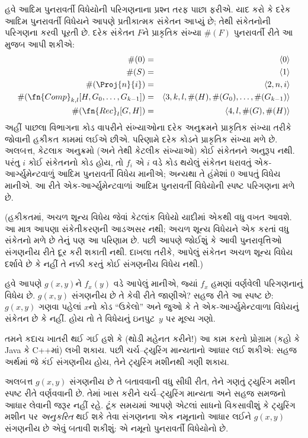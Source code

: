 હવે આદિમ પુનરાવર્તી વિધેયોની પરિગણનાના પ્રશ્ન તરફ પાછા ફરીએ.
યાદ કરો કે દરેક આદિમ પુનરાવર્તી વિધેયને આપણે પ્રતીકાત્મક
સંકેતન આપ્યું છે; તેથી સંકેતનોની પરિગણના કરવી પૂરતી છે. દરેક
સંકેતન $F$ને પ્રાકૃતિક સંખ્યા $\#(F)$ પુનરાવર્તી રીતે આ મુજબ
આપી શકીએ:
\begin{eqnarray*}
\#(0) & = & \langle 0 \rangle \\
\#(S) & = & \langle 1 \rangle \\
\#(\Proj{n}{i}) & = & \langle 2, n, i \rangle \\
\#(\fn{Comp}_{k,l}[H,G_0,\dots,G_{k-1}]) & = & \langle
3,k,l,\#(H),\#(G_0),\dots,\#(G_{k-1}) \rangle \\
\#(\fn{Rec}_l[G,H]) & = & \langle 4, l, \#(G), \#(H) \rangle
\end{eqnarray*}
અહીં પાછલા વિભાગના કોડ વાપરીને સંખ્યાઓના દરેક અનુક્રમને પ્રાકૃતિક
સંખ્યા તરીકે જોવાની હકીકત કામમાં લઈએ છીએ. પરિણામે દરેક કોડને
પ્રાકૃતિક સંખ્યા મળે છે. અલબત્ત, કેટલાક અનુક્રમો (અને તેથી કેટલીક
સંખ્યાઓ) કોઈ સંકેતનને અનુરૂપ નથી. પરંતુ $i$ કોઈ સંકેતનનો કોડ
હોય, તો $f_i$ એ $i$ વડે કોડ થયેલું સંકેતન ધરાવતું એક-આર્ગ્યુમેન્ટવાળું આદિમ
પુનરાવર્તી વિધેય માનીએ; અન્યથા તે હંમેશાં $0$ આપતું વિધેય માનીએ.
આ રીતે એક-આર્ગ્યુમેન્ટવાળાં આદિમ પુનરાવર્તી વિધેયોની સ્પષ્ટ
પરિગણના મળે છે.

(હકીકતમાં, અચળ શૂન્ય વિધેય જેવાં કેટલાંક વિધેયો યાદીમાં એકથી વધુ
વખત આવશે. આ માત્ર આપણા સંકેતીકરણની આડઅસર નથી; અચળ શૂન્ય
વિધેયને એક કરતાં વધુ સંકેતનો મળે છે તેનું પણ આ પરિણામ છે.
પછી આપણે જોઈશું કે આવી પુનરાવૃત્તિઓ સંગણનીય રીતે દૂર કરી શકાતી
નથી. દાખલા તરીકે, આપેલું સંકેતન અચળ શૂન્ય વિધેય દર્શાવે છે કે
નહીં તે નક્કી કરતું કોઈ સંગણનીય વિધેય નથી.)

હવે આપણે $g(x,y)$ને $f_x(y)$ વડે આપેલું માનીએ, જ્યાં $f_x$ હમણાં
વર્ણવેલી પરિગણનાનું વિધેય છે. $g(x,y)$ સંગણનીય છે તે કેવી રીતે
જાણીએ? સહજ રીતે આ સ્પષ્ટ છે: $g(x,y)$ ગણવા પહેલાં $x$નો કોડ
``ઉકેલો'' અને જુઓ કે તે એક-આર્ગ્યુમેન્ટવાળા વિધેયનું સંકેતન છે
કે નહીં. હોય તો તે વિધેયનું ઇનપુટ~$y$ પર મૂલ્ય ગણો.

\begin{digress}
તમને કદાચ ખાતરી થઈ ગઈ હશે કે (થોડી મહેનત કરીને!) આ કામ કરતો
પ્રોગ્રામ (કહો કે Java કે C++માં) લખી શકાય. પછી ચર્ચ--ટ્યુરિંગ
માન્યતાનો આધાર લઈ શકીએ: સહજ અર્થમાં જે કંઈ સંગણનીય હોય, તેને
ટ્યુરિંગ મશીનથી ગણી શકાય.

અલબત્ત $g(x,y)$ સંગણનીય છે તે બતાવવાની વધુ સીધી રીત, તેને ગણતું
ટ્યુરિંગ મશીન સ્પષ્ટ રીતે વર્ણવવાની છે. તેમાં ખાસ કરીને
ચર્ચ--ટ્યુરિંગ માન્યતા અને સહજ સમજનો આધાર લેવાની જરૂર નહીં રહે.
ટૂંક સમયમાં આપણે એટલાં સાધનો વિકસાવીશું કે ટ્યુરિંગ મશીન પર
\emph{અનુકરિત} થઈ શકે તેવા સંગણનના એક નમૂનાનો આધાર લઈને
$g(x,y)$ સંગણનીય છે એવું બતાવી શકીશું: એ નમૂનો પુનરાવર્તી
વિધેયોનો છે.
\end{digress}
\endgroup


